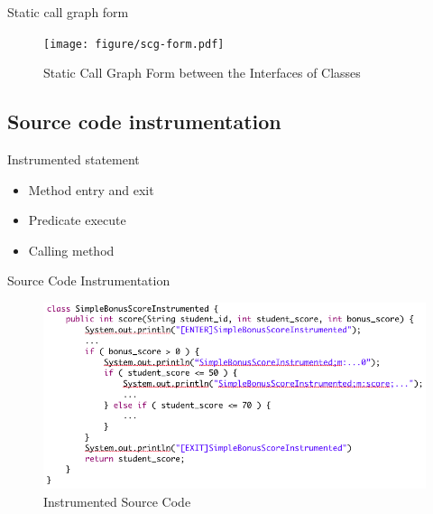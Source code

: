 \documentclass{beamer}
\begin{document}
\begin{frame}{Static call graph form}
    \begin{figure}
        \texttt{[image: figure/scg-form.pdf]}
        \caption{Static Call Graph Form between the Interfaces of Classes}
        \label{fig:scgForm}
    \end{figure}
\end{frame}

\subsection{Source code instrumentation}

\begin{frame}{Instrumented statement}
    \begin{itemize}
        \item Method entry and exit
        \item Predicate execute
        \item Calling method
    \end{itemize}
\end{frame}

\begin{frame}{Source Code Instrumentation}
    \begin{figure}
        \includegraphics[width=.7\paperwidth]{figure/instrumented-code.png}
        \caption{Instrumented Source Code}
        \label{fig:instrumentedSourceCode}
    \end{figure}
\end{frame}
\end{document}
